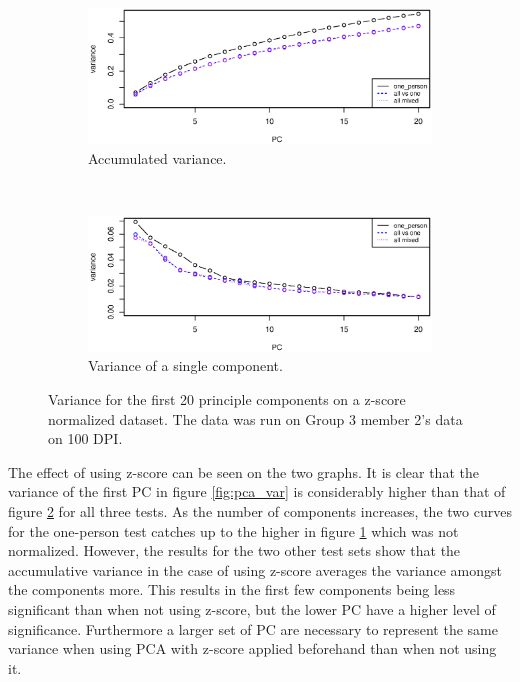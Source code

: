 \begin{figure}[H]
\centering
\begin{subfigure}{0.70\textwidth}
\centering
\includegraphics[width=\textwidth]{graphics/pca_acc_variance_zs}
\caption{Accumulated variance.}
\label{fig:pca_accumulated_var_zscore}
\end{subfigure}\\[-1cm]
\begin{subfigure}{0.70\textwidth}
\centering
\includegraphics[width=\textwidth]{graphics/pca_variance_zs}
\caption{Variance of a single component.}
\label{fig:pca_var_zscore}
\end{subfigure}
\caption[PCA variance when data is normalized using z-score.]{Variance for the first 20 principle components on a z-score normalized dataset.
The data was run on Group 3 member 2's data on 100 DPI. }
\label{fig:variance_zscore}
\end{figure}


The effect of using z-score can be seen on the two graphs.
It is clear that the variance of the first PC in figure \ref{fig:pca_var} is considerably higher than that of figure \ref{fig:pca_var_zscore} for all three tests.
As the number of components increases, the two curves for the one-person test catches up to the higher in figure \ref{fig:pca_accumulated_var_zscore} which was not normalized.
However, the results for the two other test sets show that the accumulative variance in the case of using z-score averages the variance amongst the components more.
This results in the first few components being less significant than when not using z-score, but the lower PC have a higher level of significance.
Furthermore a larger set of PC are necessary to represent the same variance when using PCA with z-score applied beforehand than when not using it.



